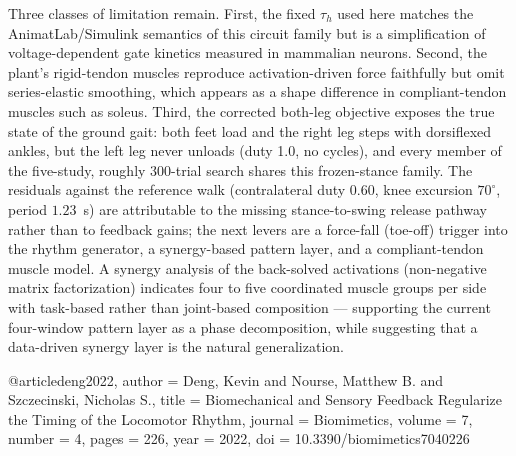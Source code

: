 Three classes of limitation remain. First, the fixed $\tau_h$ used
here matches the AnimatLab/Simulink semantics of this circuit family
\citep{deng2022} but is a simplification of voltage-dependent gate
kinetics measured in mammalian neurons. Second, the plant's
rigid-tendon muscles reproduce activation-driven force faithfully but
omit series-elastic smoothing, which appears as a shape difference in
compliant-tendon muscles such as soleus. %
Third, the corrected both-leg objective exposes the true state of
the ground gait: both feet load and the right leg steps with
dorsiflexed ankles, but the left leg never unloads (duty 1.0, no
cycles), and every member of the five-study, roughly 300-trial
search shares this frozen-stance family. The residuals against the reference walk (contralateral duty
0.60, knee excursion $70^\circ$, period $1.23$~s) are attributable to
the missing stance-to-swing release pathway rather than to feedback
gains; the next levers are a force-fall (toe-off) trigger into the
rhythm generator, a synergy-based pattern layer, and a
compliant-tendon muscle model.
A synergy analysis of the
back-solved activations (non-negative matrix factorization) indicates
four to five coordinated muscle groups per side with task-based rather
than joint-based composition — supporting the current four-window
pattern layer as a phase decomposition, while suggesting that a
data-driven synergy layer is the natural generalization.


@article{deng2022,
  author  = {Deng, Kevin and Nourse, Matthew B. and Szczecinski, Nicholas S.},
  title   = {Biomechanical and Sensory Feedback Regularize the Timing of the Locomotor Rhythm},
  journal = {Biomimetics},
  volume  = {7},
  number  = {4},
  pages   = {226},
  year    = {2022},
  doi     = {10.3390/biomimetics7040226}
}


